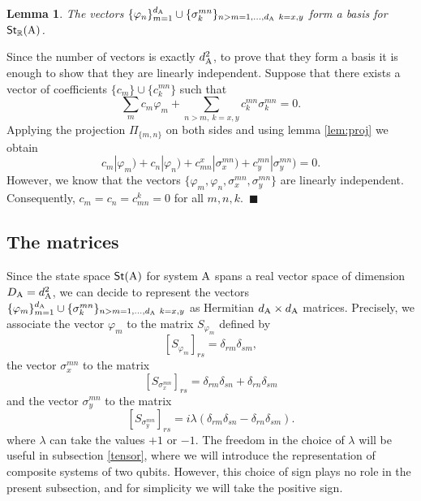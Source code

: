 \documentclass[12pt,aps,pra,showpacs,groupedaddress]{revtex4-1}
\newtheorem{lemma}{Lemma} \newtheorem{proposition}{Proposition}
\def\Proof{\medskip\par\noindent{\bf Proof. }}
\def\qed{$\,\blacksquare$\par}
\def\Stset{{\mathsf{St}}}
\begin{document}
\begin{lemma}
  The vectors $\{\varphi_n\}_{m=1}^{d_{\rm A}} \cup \{\sigma_k^{mn}\}_{n>m=1,\dots,d_{\rm A}\
    k=x,y}$ form a  basis for  $\Stset_{\mathbb R}(\rA)$.
  \label{lem:matrep}
\end{lemma}

\Proof Since the number of vectors is exactly $d_{\rm A}^2$, to prove that they form a basis it is
enough to show that they are linearly independent.  Suppose that there exists a vector of
coefficients $\{c_m\}\cup\{c_{k}^{mn}\}$ such that
\begin{equation*}
 \sum_m c_m\varphi_m+\sum_{n>m,\ k=x,y}c_{k}^{mn}\sigma_{k}^{mn}=0.
\end{equation*}
Applying the projection $\Pi_{\{m,n\}}$ on both sides and using lemma \ref{lem:proj} we obtain
\begin{equation*}
  c_m|\varphi_m)+c_n|\varphi_n)+c^{x}_{mn}|\sigma_x^{mn})+c_{y}^{mn}|\sigma_y^{mn})=0.
\end{equation*}
However, we know that the vectors $\{\varphi_m,\varphi_n,\sigma_x^{mn},\sigma_y^{mn}\}$ are linearly
independent. Consequently, $c_m=c_n=c^k_{mn}=0$ for all $m,n,k$.  \qed

\subsection{The matrices}

Since the state space $\Stset(\rA)$ for system ${\rm A}$ spans a real vector space of dimension
$D_{\rm A}=d_{\rm A}^2$, we can decide to represent the vectors $\{\varphi_m\}_{m=1}^{d_{\rm A}} \cup
\{\sigma_k^{mn}\}_{n>m=1,\dots,d_{\rm A}\ k=x,y}$ as Hermitian $d_{\rm A} \times d_{\rm A}$ matrices.
Precisely, we associate the vector $\varphi_m$ to the matrix $S_{\varphi_m}$ defined by
\begin{equation}\label{matphii}
  \left[S_{\varphi_m}\right]_{rs} =  \delta_{rm} \delta_{sm},
\end{equation} 
the vector $\sigma^{mn}_{x}$ to the matrix 
\begin{equation}\label{matsx}
  \left[S_{\sigma^{mn}_x}\right]_{rs} =  \delta_{rm} \delta_{sn}  + \delta_{rn} \delta_{sm}
\end{equation}
and the vector $\sigma^{mn}_{y}$ to the matrix 
\begin{equation}
  \left[S_{\sigma^{mn}_y}\right]_{rs} = i \lambda \left( \delta_{rm} \delta_{sn}  - \delta_{rn} \delta_{sm}\right).\label{eq:itsimportant}
\end{equation}
where $\lambda$ can take the values $+1$ or $-1$. The freedom in the
choice of $\lambda$ will be useful in subsection
\ref{tensor}, where we will introduce the representation of composite
systems of two qubits.  However, this choice of sign plays no role in
the present subsection, and for simplicity we will take the positive
sign.
\end{document}
